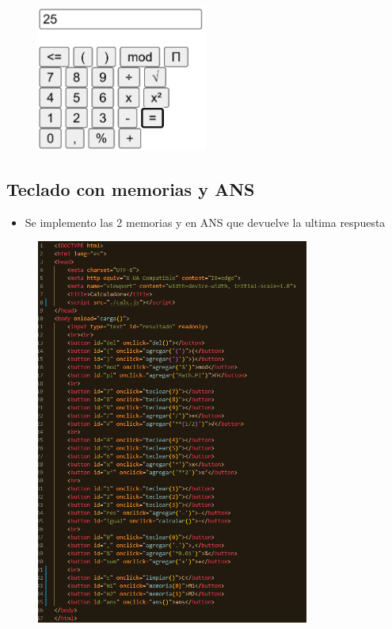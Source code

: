 \documentclass{article}
\begin{document}
	\begin{figure}[H]
		\centering
		\includegraphics[width=0.5\textwidth,keepaspectratio]{img/calc03.png}
	\end{figure}
\subsection{Teclado con memorias y ANS}
	\begin{itemize}	
		\item Se implemento las 2 memorias y en ANS que devuelve la ultima respuesta
	\end{itemize}
	\begin{figure}[H]
		\centering
		\includegraphics[width=0.8\textwidth,keepaspectratio]{src/e1/calc03.png}
	\end{figure}
\end{document}
